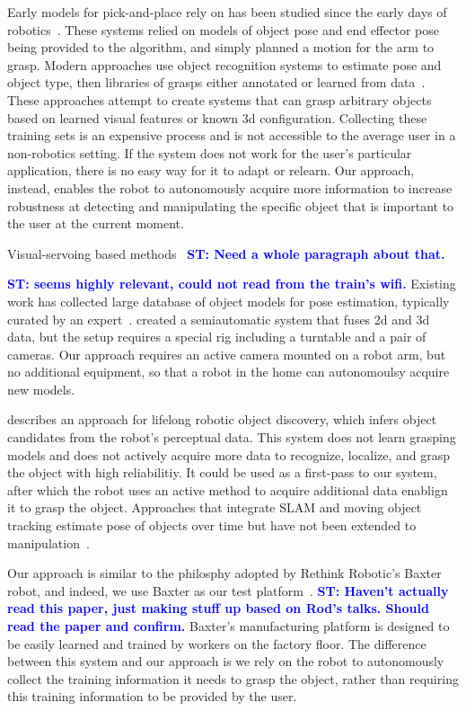 \documentclass{article}
\newcommand{\stnote}[1]{\textcolor{blue}{\textbf{ST: #1}}}
\begin{document}
Early models for pick-and-place rely on has been studied since the
early days of robotics~\citep{brooks83, lozano89}.  These systems
relied on models of object pose and end effector pose being provided to the
algorithm, and simply planned a motion for the arm to grasp.  Modern
approaches use object recognition systems to estimate pose and object
type, then libraries of grasps either annotated or learned from
data~\citep{saxena08, goldfeder09, morales03}.  These approaches
attempt to create systems that can grasp arbitrary objects based on
learned visual features or known 3d configuration.  Collecting these
training sets is an expensive process and is not accessible to the
average user in a non-robotics setting.  If the system does not work
for the user's particular application, there is no easy way for it to
adapt or relearn.  Our approach, instead, enables the robot to
autonomously acquire more information to increase robustness at
detecting and manipulating the specific object that is important to
the user at the current moment.

Visual-servoing based methods~\citep{chaumette06} \stnote{Need a whole
  paragraph about that. }

\stnote{\citet{ciocarlie14} seems highly relevant, could not read from
  the train's wifi.}  Existing work has collected large database of
object models for pose estimation, typically curated by an
expert~\citep{lai11}.  \citet{kasper12} created a semiautomatic system
that fuses 2d and 3d data, but the setup requires a special rig
including a turntable and a pair of cameras.  Our approach requires an
active camera mounted on a robot arm, but no additional equipment, so
that a robot in the home can autonomoulsy acquire new models.

\citet{collect14} describes an approach for lifelong robotic object
discovery, which infers object candidates from the robot's perceptual
data.  This system does not learn grasping models and does not
actively acquire more data to recognize, localize, and grasp the
object with high reliabilitiy.  It could be used as a first-pass to
our system, after which the robot uses an active method to acquire
additional data enablign it to grasp the object.  Approaches that
integrate SLAM and moving object tracking estimate pose of objects
over time but have not been extended to manipulation~\citep{wang07,
  gallagher09, salas-moreno13, selvatici08}.

Our approach is similar to the philosphy adopted by Rethink Robotic's
Baxter robot, and indeed, we use Baxter as our test
platform~\citep{fitzgerald13}.  \stnote{Haven't actually read this
  paper, just making stuff up based on Rod's talks.  Should read the
  paper and confirm.}  Baxter's manufacturing platform is designed to
be easily learned and trained by workers on the factory floor.  The
difference between this system and our approach is we rely on the
robot to autonomously collect the training information it needs to
grasp the object, rather than requiring this training information to
be provided by the user.
\end{document}
